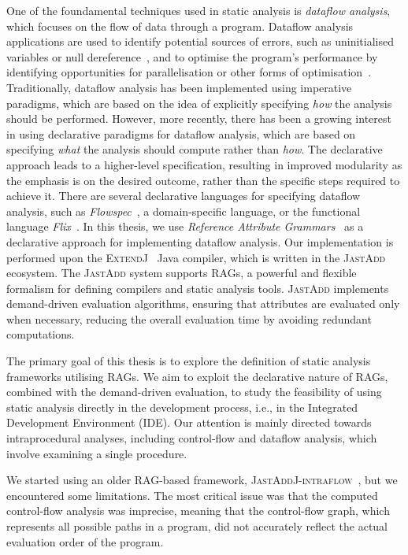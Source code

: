 One of the foundamental techniques used in static analysis is \emph{dataflow analysis},
which focuses on the flow of data through a program. Dataflow analysis applications are used to identify
potential sources of errors, such as uninitialised variables or null dereference~\cite{khedker2017data},
and to optimise the program's performance by identifying opportunities for
parallelisation or other forms of optimisation~\cite{aho2007compilers}.
Traditionally, dataflow analysis has been implemented using imperative paradigms,
which are based on the idea of explicitly specifying \emph{how} the analysis should be
performed.
However, more recently, there has been a growing interest in using
declarative paradigms for dataflow analysis, which are based on specifying \emph{what}
the analysis should compute rather than \emph{how}.
The declarative approach leads to a higher-level specification, resulting in improved modularity as
the emphasis is on the desired outcome, rather than the specific steps required to 
achieve it.
There are several declarative languages for specifying dataflow analysis, 
such as \emph{Flowspec}~\cite{smits2020flowspec}, a domain-specific language,
or the functional language \emph{Flix}~\cite{madsen2016programming}. In this thesis, we use \emph{Reference 
Attribute Grammars}~\cite{hedin2000rags} as a declarative approach for implementing dataflow analysis. 
Our implementation is performed upon the \textsc{ExtendJ}~\cite{ekman2007jastadd} Java compiler,
which is written in the \textsc{JastAdd}~\cite{DBLP:journals/entcs/HedinM01} ecosystem.
The \textsc{JastAdd} system supports RAGs, a powerful and flexible
formalism for defining compilers and static analysis tools. 
\textsc{JastAdd} implements demand-driven evaluation algorithms, ensuring that attributes are evaluated only 
when necessary, reducing the overall evaluation time by avoiding redundant
computations.

The primary goal of this thesis is to explore the definition of static analysis 
frameworks utilising RAGs.
We aim to exploit the declarative nature of RAGs, 
combined with the demand-driven evaluation, to study the feasibility of using static 
analysis directly in the development process, i.e., in the Integrated Development Environment (IDE).
Our attention is mainly directed towards intraprocedural analyses, 
including control-flow and dataflow analysis, which involve examining a single procedure.

We started using an older RAG-based framework, \textsc{JastAddJ-intraflow}~\cite{10.1016/j.scico.2012.02.002},
but we encountered some limitations. The most critical issue was that the computed 
control-flow analysis was imprecise, meaning that the 
control-flow graph, which represents all possible paths in a program, did not 
accurately reflect the actual evaluation order of the program.

